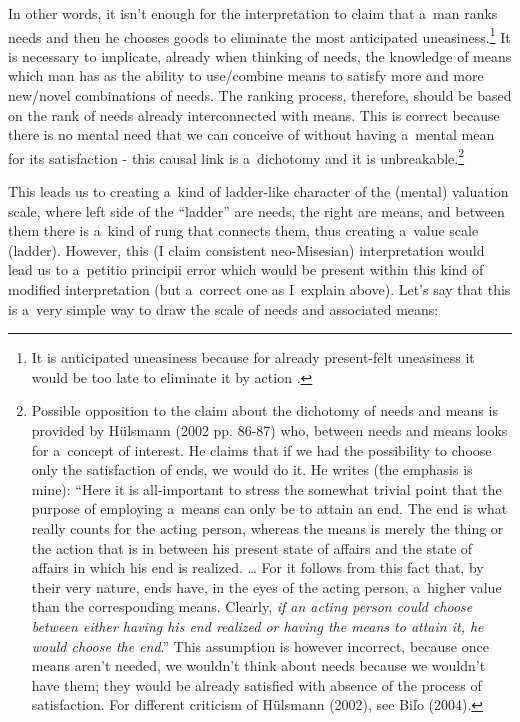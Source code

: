 In other words, it isn't enough for the interpretation to claim that a~man ranks needs and then he chooses goods to eliminate the most anticipated uneasiness.\footnote{It is anticipated uneasiness because for already present-felt uneasiness it would be too late to eliminate it by action 
\parencites[][]{}[][]{}.%
} It is necessary to implicate, already when thinking of needs, the knowledge of means which man has as the ability to use/combine means to satisfy more and more new/novel combinations of needs. The ranking process, therefore, should be based on the rank of needs already interconnected with means. This is correct because there is no mental need that we can conceive of without having a~mental mean for its satisfaction - this causal link is a~dichotomy and it is unbreakable.\footnote{Possible opposition to the claim about the dichotomy of needs and means is provided by Hülsmann (2002 pp. 86-87) who, between needs and means looks for a~concept of interest. He claims that if we had the possibility to choose only the satisfaction of ends, we would do it. He writes (the emphasis is mine): ``Here it is all-important to stress the somewhat trivial point that the purpose of employing a~means can only be to attain an end. The end is what really counts for the acting person, whereas the means is merely the thing or the action that is in between his present state of affairs and the state of affairs in which his end is realized. … For it follows from this fact that, by their very nature, ends have, in the eyes of the acting person, a~higher value than the corresponding means. Clearly, \textit{if an acting person could choose between either having his end realized or having the means to attain it, he would choose the end}.'' This assumption is however incorrect, because once means aren't needed, we wouldn't think about needs because we wouldn't have them; they would be already satisfied with absence of the process of satisfaction. For different criticism of Hülsmann (2002), see Biľo (2004).}



This leads us to creating a~kind of ladder-like character of the (mental) valuation scale, where left side of the ``ladder'' are needs, the right are means, and between them there is a~kind of rung that connects them, thus creating a~value scale (ladder). However, this (I claim consistent neo-Misesian) interpretation would lead us to a~petitio principii error which would be present within this kind of modified interpretation (but a~correct one as I~explain above). Let's say that this is a~very simple way to draw the scale of needs and associated means:



